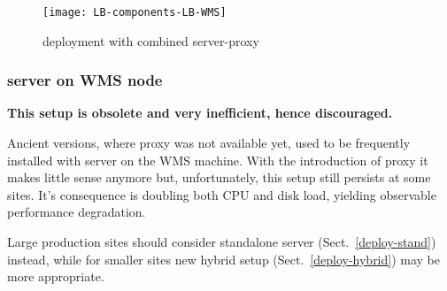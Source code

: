 \begin{figure}[ht]
\centering
\texttt{[image: LB-components-LB-WMS]}
\caption{\LB deployment with combined server-proxy}
\label{f:comp-hybrid}
\end{figure}


\subsubsection{\LB server on WMS node}

\textbf{This setup is obsolete and very inefficient, hence discouraged.}

Ancient \LB versions, where \LB proxy was not available yet,
used to be frequently installed with \LB server on the WMS machine.
With the introduction of \LB proxy it makes little sense anymore
but, unfortunately, this setup still persists at some sites.
It's consequence is doubling both CPU and disk load, yielding observable
performance degradation.

Large production sites should consider standalone \LB server (Sect.~\ref{deploy-stand})
instead, while for smaller sites new hybrid setup (Sect.~\ref{deploy-hybrid}) may
be more appropriate.
